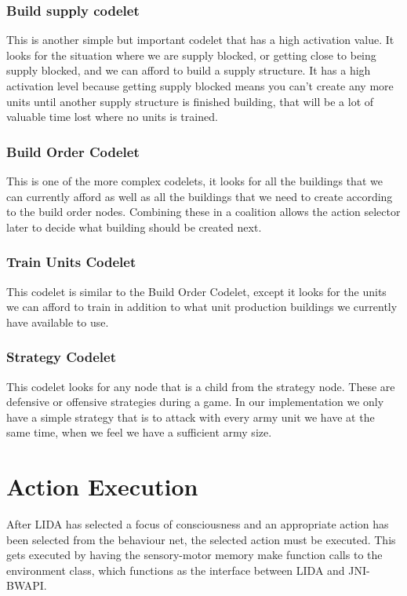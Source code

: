 \subsubsection{Build supply codelet}
This is another simple but important codelet that has a high activation value. It looks for the situation where we are supply blocked, or getting close to being supply blocked, and we can afford to build a supply structure. It has a high activation level because getting supply blocked means you can't create any more units until another supply structure is finished building, that will be a lot of valuable time lost where no units is trained.

\subsubsection{Build Order Codelet}
This is one of the more complex codelets, it looks for all the buildings that we can currently afford as well as all the buildings that we need to create according to the build order nodes. Combining these in a coalition allows the action selector later to decide what building should be created next.

\subsubsection{Train Units Codelet}
This codelet is similar to the Build Order Codelet, except it looks for the units we can afford to train in addition to what unit production buildings we currently have available to use.

\subsubsection{Strategy Codelet}
This codelet looks for any node that is a child from the strategy node. These are defensive or offensive strategies during a game. In our implementation we only have a simple strategy that is to attack with every army unit we have at the same time, when we feel we have a sufficient army size.

\section{Action Execution}
\label{sec:actionexecution}
After LIDA has selected a focus of consciousness and an appropriate action has been selected from the behaviour net, the selected action must be executed. This gets executed by having the sensory-motor memory make function calls to the environment class, which functions as the interface between LIDA and JNI-BWAPI.

